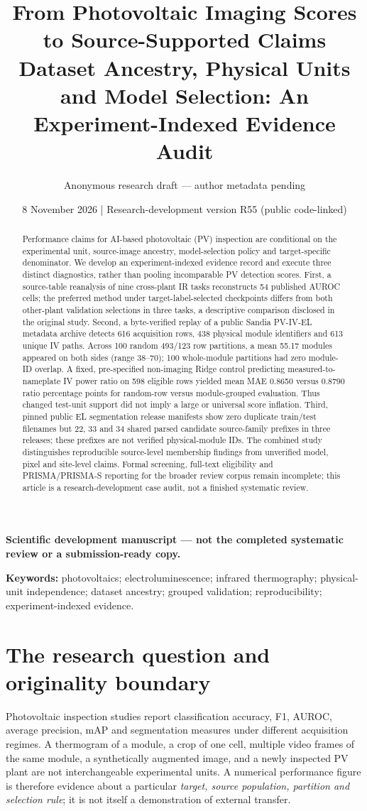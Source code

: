 \documentclass[10pt,a4paper]{article}
\title{From Photovoltaic Imaging Scores to Source-Supported Claims\\
\large Dataset Ancestry, Physical Units and Model Selection: An Experiment-Indexed Evidence Audit}
\author{Anonymous research draft --- author metadata pending}
\date{8 November 2026 \;|\; Research-development version R55 (public code-linked)}
\newcommand{\papertype}{\textbf{Scientific development manuscript --- not the completed systematic review or a submission-ready copy.}}
\begin{document}
\maketitle
\begin{center}\small\papertype\end{center}
\begin{abstract}
Performance claims for AI-based photovoltaic (PV) inspection are conditional on the experimental unit, source-image ancestry, model-selection policy and target-specific denominator. We develop an experiment-indexed evidence record and execute three distinct diagnostics, rather than pooling incomparable PV detection scores. First, a source-table reanalysis of nine cross-plant IR tasks reconstructs 54 published AUROC cells; the preferred method under target-label-selected checkpoints differs from both other-plant validation selections in three tasks, a descriptive comparison disclosed in the original study. Second, a byte-verified replay of a public Sandia PV-IV-EL metadata archive detects 616 acquisition rows, 438 physical module identifiers and 613 unique IV paths. Across 100 random 493/123 row partitions, a mean 55.17 modules appeared on both sides (range 38--70); 100 whole-module partitions had zero module-ID overlap. A fixed, pre-specified non-imaging Ridge control predicting measured-to-nameplate IV power ratio on 598 eligible rows yielded mean MAE 0.8650 versus 0.8790 ratio percentage points for random-row versus module-grouped evaluation. Thus changed test-unit support did not imply a large or universal score inflation. Third, pinned public EL segmentation release manifests show zero duplicate train/test filenames but 22, 33 and 34 shared parsed candidate source-family prefixes in three releases; these prefixes are not verified physical-module IDs. The combined study distinguishes reproducible source-level membership findings from unverified model, pixel and site-level claims. Formal screening, full-text eligibility and PRISMA/PRISMA-S reporting for the broader review corpus remain incomplete; this article is a research-development case audit, not a finished systematic review.
\end{abstract}
\noindent\textbf{Keywords:} photovoltaics; electroluminescence; infrared thermography; physical-unit independence; dataset ancestry; grouped validation; reproducibility; experiment-indexed evidence.

\section{The research question and originality boundary}
Photovoltaic inspection studies report classification accuracy, F1, AUROC, average precision, mAP and segmentation measures under different acquisition regimes. A thermogram of a module, a crop of one cell, multiple video frames of the same module, a synthetically augmented image, and a newly inspected PV plant are not interchangeable experimental units. A numerical performance figure is therefore evidence about a particular \emph{target, source population, partition and selection rule}; it is not itself a demonstration of external transfer.
\end{document}
